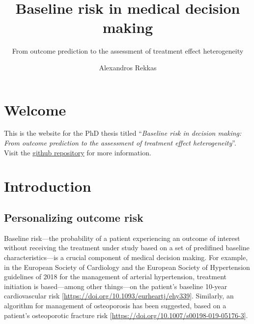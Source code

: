 \documentclass[
]{book}
\title{Baseline risk in medical decision making}
\subtitle{From outcome prediction to the assessment of treatment effect heterogeneity}
\author{Alexandros Rekkas}
\date{}
\begin{document}
\maketitle

{
\setcounter{tocdepth}{0}
\tableofcontents
}
\hypertarget{welcome}{%
\chapter*{Welcome}\label{welcome}}

This is the website for the PhD thesis titled ``\emph{Baseline risk in decision
making: From outcome prediction to the assessment of treatment effect
heterogeneity}''. Visit the \href{https://github.com/rekkasa/thesis}{github
repository} for more information.

\hypertarget{introduction}{%
\chapter{Introduction}\label{introduction}}

\vspace*{\fill}\par
\pagebreak

\hypertarget{personalizing-outcome-risk}{%
\section{Personalizing outcome risk}\label{personalizing-outcome-risk}}

Baseline risk---the probability of a patient experiencing an outcome of interest
without receiving the treatment under study based on a set of predifined
baseline characteristics---is a crucial component of medical decision making.
For example, in the European Society of Cardiology and the European Society of
Hypertension guidelines of 2018 for the management of arterial hypertension,
treatment initiation is based---among other things---on the patient's baseline
10-year cardiovascular risk
{[}\url{https://doi.org/10.1093/eurheartj/ehy339}{]}. Similarly, an algorithm for
management of osteoporosis has been suggested, based on a patient's osteoporotic
fracture risk {[}\url{https://doi.org/10.1007/s00198-019-05176-3}{]}.
\end{document}
